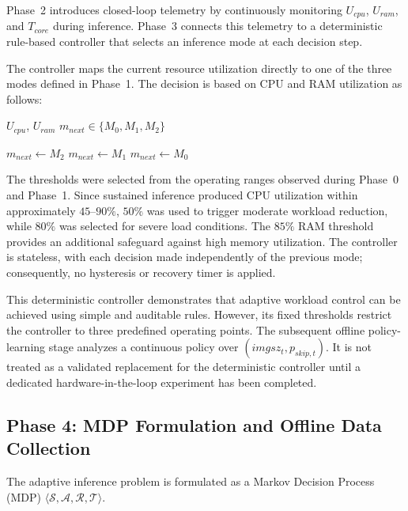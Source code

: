 \documentclass{ieeeaccess}
\begin{document}
Phase~2 introduces closed-loop telemetry by continuously monitoring
$U_{cpu}$, $U_{ram}$, and $T_{core}$ during inference. Phase~3 connects
this telemetry to a deterministic rule-based controller that selects an
inference mode at each decision step.

The controller maps the current resource utilization directly to one of the
three modes defined in Phase~1. The decision is based on CPU and RAM
utilization as follows:

\begin{algorithm}[H]
\caption{Deterministic Adaptive Controller}
\label{alg:heuristic}
\begin{algorithmic}[1]
\Require $U_{cpu}$, $U_{ram}$
\Ensure $m_{next} \in \{M_0,M_1,M_2\}$

    \State $m_{next}\gets M_2$ 
    \State $m_{next}\gets M_1$ 
\Else
    \State $m_{next}\gets M_0$ 
\EndIf
\end{algorithmic}
\end{algorithm}

The thresholds were selected from the operating ranges observed during
Phase~0 and Phase~1. Since sustained inference produced CPU utilization
within approximately $45$--$90\%$, $50\%$ was used to trigger moderate
workload reduction, while $80\%$ was selected for severe load conditions.
The $85\%$ RAM threshold provides an additional safeguard against high
memory utilization. The controller is stateless, with each decision made
independently of the previous mode; consequently, no hysteresis or recovery
timer is applied.

This deterministic controller demonstrates that adaptive workload control
can be achieved using simple and auditable rules. However, its fixed
thresholds restrict the controller to three predefined operating points.
The subsequent offline policy-learning stage analyzes a continuous policy
over $(imgsz_t,p_{skip,t})$. It is not treated as a validated replacement for
the deterministic controller until a dedicated hardware-in-the-loop experiment
has been completed.

\subsection{Phase 4: MDP Formulation and Offline Data Collection}

The adaptive inference problem is formulated as a Markov Decision Process
(MDP) $\langle \mathcal{S}, \mathcal{A}, \mathcal{R}, \mathcal{T} \rangle$.
\end{document}
